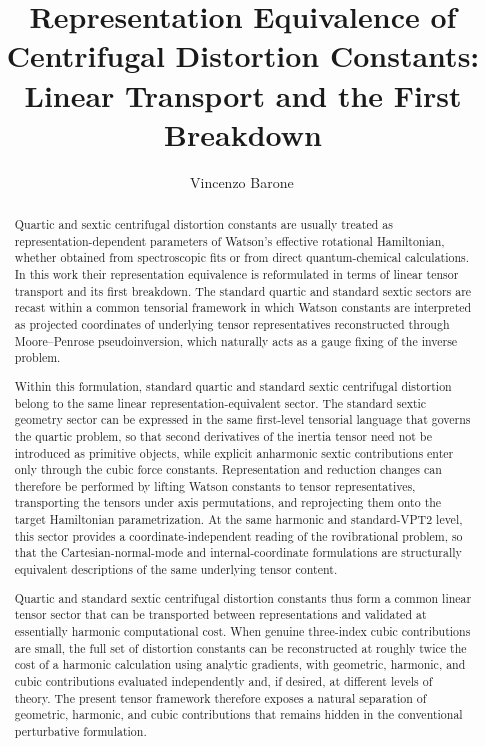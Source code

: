 \documentclass[journal=jacsat,manuscript=article]{achemso}
\title{Representation Equivalence of Centrifugal Distortion Constants: Linear Transport and the First Breakdown}
\author{Vincenzo Barone\,\orcidlink{0000-0001-6420-4107}}
\affiliation[c]{INSTM, via G. Giusti 9, 50121 Firenze, Italy}
\begin{document}
\begin{tocentry}
\end{tocentry}

\begin{abstract}
Quartic and sextic centrifugal distortion constants are usually treated as
representation-dependent parameters of Watson's effective rotational
Hamiltonian, whether obtained from spectroscopic fits or from direct
quantum-chemical calculations. In this work their representation equivalence
is reformulated in terms of linear tensor transport and its first breakdown.
The standard quartic and standard sextic sectors are recast within a common
tensorial framework in which Watson constants are interpreted as projected
coordinates of underlying tensor representatives reconstructed through
Moore--Penrose pseudoinversion, which naturally acts as a gauge fixing of the
inverse problem.

Within this formulation, standard quartic and standard sextic centrifugal
distortion belong to the same linear representation-equivalent sector. The
standard sextic geometry sector can be expressed in the same first-level
tensorial language that governs the quartic problem, so that second
derivatives of the inertia tensor need not be introduced as primitive
objects, while explicit anharmonic sextic contributions enter only through
the cubic force constants. Representation and reduction changes can therefore
be performed by lifting Watson constants to tensor representatives,
transporting the tensors under axis permutations, and reprojecting them onto
the target Hamiltonian parametrization.
At the same harmonic and standard-VPT2 level, this sector provides a
coordinate-independent reading of the rovibrational problem, so that the
Cartesian-normal-mode and internal-coordinate formulations are structurally
equivalent descriptions of the same underlying tensor content.

Quartic and standard sextic centrifugal distortion constants thus form a
common linear tensor sector that can be transported between representations
and validated at essentially harmonic computational cost. When genuine
three-index cubic contributions are small, the full set of distortion
constants can be reconstructed at roughly twice the cost of a harmonic
calculation using analytic gradients, with geometric, harmonic, and cubic
contributions evaluated independently and, if desired, at different levels of
theory. The present tensor framework therefore exposes a natural separation
of geometric, harmonic, and cubic contributions that remains hidden in the
conventional perturbative formulation.


\end{abstract}
\end{document}
